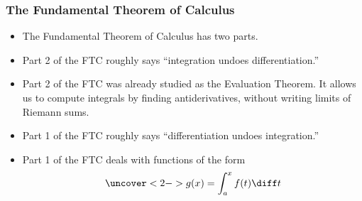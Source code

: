 \begin{frame}
\frametitle{The Fundamental Theorem of Calculus}
\begin{itemize}
\item  The Fundamental Theorem of Calculus has two parts.
\item<2->  Part 2 of the FTC roughly says ``integration undoes differentiation.''
\item<3->  Part 2 of the FTC was already studied as the Evaluation Theorem. It allows us to compute integrals by finding antiderivatives, without writing limits of Riemann sums.

\item<4->  Part 1 of the FTC roughly says ``differentiation undoes integration.''
\item<5->  Part 1 of the FTC deals with functions of the form
\[
\uncover<2->{%
g(x) = \int_a^x  f(t) \diff t%
}%
\]
\end{itemize}
\end{frame}
